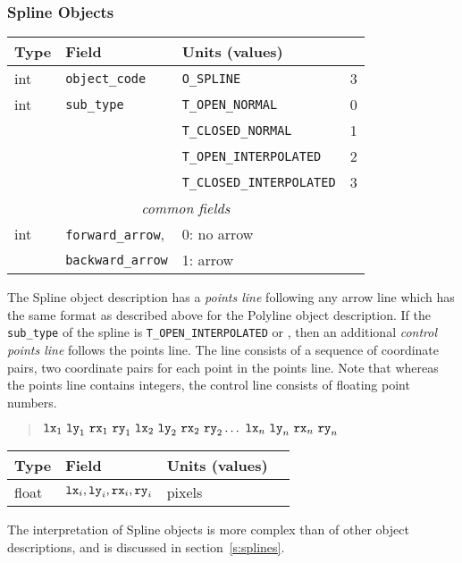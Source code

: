 \subsubsection{Spline Objects}
%
\begin{center}
\begin{tabular} {|l|l|ll|}
\hline
Type	& Field			& Units (values)		&	\\ \hline
\hline
%
int	& {\tt object\_code}	& {\tt O\_SPLINE}		& 3	\\ \hline
%
int	& {\tt sub\_type}	& {\tt T\_OPEN\_NORMAL}		& 0	\\
	&			& {\tt T\_CLOSED\_NORMAL} 	& 1	\\
	&			& {\tt T\_OPEN\_INTERPOLATED}	& 2	\\
	&			& {\tt T\_CLOSED\_INTERPOLATED}	& 3	\\ \hline
%
\multicolumn{4}{c}{\it common fields}					\\ \hline
%
int	& {\tt forward\_arrow},	& 0: no arrow			&	\\
	& {\tt backward\_arrow}	& 1: arrow			&	\\ \hline
\end{tabular}
\end{center}
%
The Spline object description has a {\em points line} following
	any arrow line which has the same format as described above
	for the Polyline object description.
If the {\tt sub\_type} of the spline is	{\tt T\_OPEN\_INTERPOLATED} or
	, then an additional
	{\em control points line} follows the points line.
The line consists of a sequence of coordinate pairs, two coordinate pairs
	for each point in the points line.
Note that whereas the points line contains integers, the control line
consists of floating point numbers.
%
\begin{quote}
$
	{\tt lx}_1 ~{\tt ly}_1 ~{\tt rx}_1 ~{\tt ry}_1
	~{\tt lx}_2 ~{\tt ly}_2 ~{\tt rx}_2 ~{\tt ry}_2
	\ldots
	~{\tt lx}_n ~{\tt ly}_n ~{\tt rx}_n ~{\tt ry}_n
$
\end{quote}
%
\begin{center}
\begin{tabular} {|l|l|ll|}
\hline
Type	& Field			& Units (values)	&	\\ \hline
\hline
%
float	& ${\tt lx}_i,{\tt ly}_i,
	   {\tt rx}_i,{\tt ry}_i$& pixels		&	\\ \hline
\end{tabular}
\end{center}
%
The interpretation of Spline objects is more complex than of other
	object descriptions, and is discussed in section~\ref{s:splines}.

